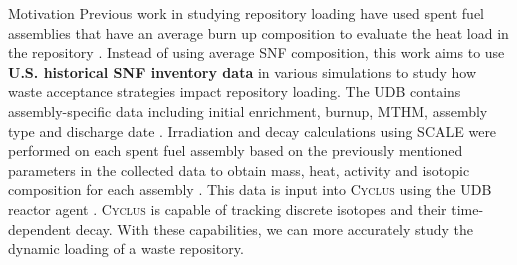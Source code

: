 \documentclass[final]{beamer}
\newlength{\onecolwid}
\newlength{\threecolwid}
\newcommand{\Cyclus}{\textsc{Cyclus}\xspace}%
\begin{document}
\begin{frame}[t]
\begin{columns}[t,totalwidth=\threecolwid]
\begin{column}{\onecolwid}
\begin{block}{Motivation}
Previous work in studying repository loading have used spent fuel assemblies 
that have an average burn up composition \cite{johnson_optimizing_2016} 
to evaluate the heat load in the repository \cite{greenberg_application_2012}.
Instead of using average \gls{SNF} composition, this work aims to use \textbf{U.S. 
historical SNF inventory data} \cite{peterson_unf_standards_2017} in various 
simulations to study how waste acceptance strategies impact repository loading.
The \gls{UDB} contains assembly-specific data including initial enrichment, 
burnup, \gls{MTHM}, assembly type and discharge date \cite{peterson_fuel_2015}. 
Irradiation and decay calculations using SCALE \cite{bowman_scale_2011} were 
performed on each spent fuel assembly based on the previously mentioned 
parameters in the collected data to obtain mass, heat, activity and isotopic 
composition for each assembly \cite{peterson_additional_2017}. 
This data is input into \Cyclus using the UDB reactor agent \cite{}. 
\Cyclus is capable of tracking discrete isotopes and their time-dependent decay. 
With these capabilities, we can more accurately study the dynamic loading 
of a waste repository. 

\end{block}



\end{column}
\end{columns}
\end{frame}
\end{document}
